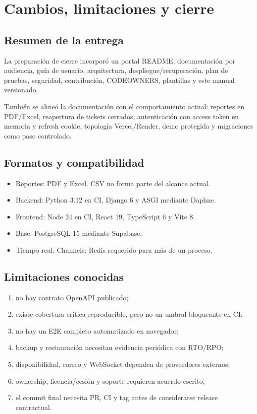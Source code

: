 \chapter{Cambios, limitaciones y cierre}

\section{Resumen de la entrega}

La preparación de cierre incorporó un portal README, documentación por audiencia, guía de usuario,
arquitectura, despliegue/recuperación, plan de pruebas, seguridad, contribución, CODEOWNERS,
plantillas y este manual versionado.

También se alineó la documentación con el comportamiento actual: reportes en PDF/Excel, reapertura
de tickets cerrados, autenticación con access token en memoria y refresh cookie, topología
Vercel/Render, demo protegida y migraciones como paso controlado.

\section{Formatos y compatibilidad}

\begin{itemize}
  \item Reportes: PDF y Excel. CSV no forma parte del alcance actual.
  \item Backend: Python 3.12 en CI, Django 6 y ASGI mediante Daphne.
  \item Frontend: Node 24 en CI, React 19, TypeScript 6 y Vite 8.
  \item Base: PostgreSQL 15 mediante Supabase.
  \item Tiempo real: Channels; Redis requerido para más de un proceso.
\end{itemize}

\section{Limitaciones conocidas}

\begin{enumerate}
  \item no hay contrato OpenAPI publicado;
  \item existe cobertura crítica reproducible, pero no un umbral bloqueante en CI;
  \item no hay un E2E completo automatizado en navegador;
  \item backup y restauración necesitan evidencia periódica con RTO/RPO;
  \item disponibilidad, correo y WebSocket dependen de proveedores externos;
  \item ownership, licencia/cesión y soporte requieren acuerdo escrito;
  \item el commit final necesita PR, CI y tag antes de considerarse release contractual.
\end{enumerate}

